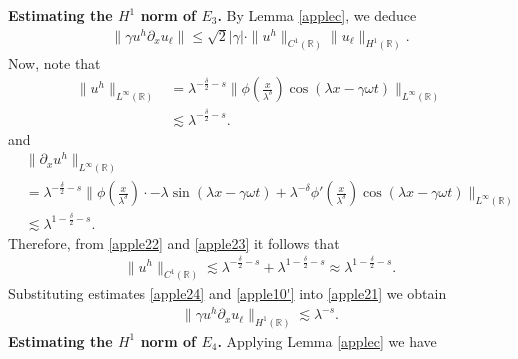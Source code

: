\documentclass[12pt,reqno]{amsart}
\newcommand{\rr}{\mathbb{R}}
\newcommand{\p}{\partial}
\theoremstyle{plain}  %
\theoremstyle{definition}
\begin{document}
%
%
\vskip0.1in
%
%
{\bf Estimating the $H^1$ norm of $\hyperref[all_errors_together]{E_3}$.} 
By Lemma \ref{applec}, we deduce
\begin{equation}
	\begin{split}
		\|\gamma u^h \p_x u_\ell \| \le \sqrt{2} |\gamma| \cdot \|u^h\|_{C^1(\rr)}
		\|u_\ell\|_{H^1(\rr)}.
		\label{apple21}
	\end{split}
\end{equation}
Now, note that
\begin{equation}
	\begin{split}
		\|u^h\|_{L^\infty(\rr)} 
		& = \lambda^{-\frac{\delta}{2} -s } \|\phi\left( \frac{x}{\lambda^\delta}
		\right) \cos \left( \lambda x - \gamma \omega t \right) \|_{L^\infty(\rr)}
		\\
		& \lesssim \lambda^{-\frac{\delta}{2} -s }.
		\label{apple22}
	\end{split}
\end{equation}
and 
\begin{equation}
	\begin{split}
		& \|\p_x u^h \|_{L^\infty(\rr)}
		\\
		& = \lambda^{-\frac{\delta}{2}-s} \|\phi\left(
		\frac{x}{\lambda^\delta}
		\right) \cdot -\lambda \sin(\lambda x - \gamma \omega t) + \lambda^{-\delta}
		\phi'\left( \frac{x}{\lambda^\delta}\right) \cos(\lambda x - \gamma \omega
		t) \|_{L^\infty(\rr)}
		\\
		& \lesssim \lambda^{1 - \frac{\delta}{2} -s }.
		\label{apple23}
	\end{split}
\end{equation}
Therefore, from \eqref{apple22} and \eqref{apple23} it follows that
\begin{equation}
	\begin{split}
		\|u^h\|_{C^1(\rr)} \lesssim \lambda^{-\frac{\delta}{2} -s } + \lambda^{1
		-\frac{\delta}{2} -s}
		\approx \lambda^{1- \frac{\delta}{2} -s}.
		\label{apple24}
	\end{split}
\end{equation}
Substituting estimates \eqref{apple24} and  \eqref{apple10'} into \eqref{apple21} we obtain
\begin{equation}
	\begin{split}
		\|\gamma u^h \p_x u_\ell \|_{H^1(\rr)} \lesssim \lambda^{-s}.
		\label{apple24'}
	\end{split}
\end{equation}
\vskip0.1in
{\bf Estimating the $H^1$ norm of $\hyperref[all_errors_together]{E_4}$.} Applying Lemma \ref{applec} we have
\end{document}

